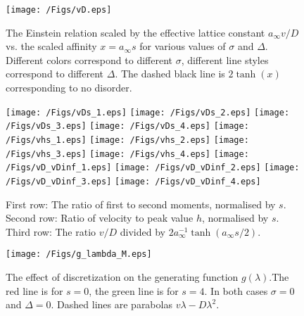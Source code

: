 \documentclass[aps,pre,floats,floatfix,fleqn]{revtex4}
\begin{document}
\begin{figure}[h]
\texttt{[image: /Figs/vD.eps]}

\caption{The Einstein relation scaled by the effective lattice constant $a_{\infty}v/D$
vs. the scaled affinity $x=a_{\infty}s$ for various values of $\sigma$ and $\Delta$.
Different colors correspond to different $\sigma$, different line styles correspond 
to different $\Delta$. 
The dashed black line is $2\tanh(x)$ corresponding to no disorder. 
}
\label{fig2}
\end{figure}



\begin{figure}

%
%
\texttt{[image: /Figs/vDs\_1.eps]}
\texttt{[image: /Figs/vDs\_2.eps]}
\texttt{[image: /Figs/vDs\_3.eps]}
\texttt{[image: /Figs/vDs\_4.eps]}
%
%
\texttt{[image: /Figs/vhs\_1.eps]}
\texttt{[image: /Figs/vhs\_2.eps]}
\texttt{[image: /Figs/vhs\_3.eps]}
\texttt{[image: /Figs/vhs\_4.eps]}
%
\texttt{[image: /Figs/vD\_vDinf\_1.eps]}
\texttt{[image: /Figs/vD\_vDinf\_2.eps]}
\texttt{[image: /Figs/vD\_vDinf\_3.eps]}
\texttt{[image: /Figs/vD\_vDinf\_4.eps]}
%

\caption{
First row: The ratio of first to second moments, normalised by $s$.
Second row: Ratio of velocity to peak value $h$, normalised by $s$.
Third row: The ratio $ v/D $ divided by $2a_{\infty}^{-1}\tanh(a_{\infty}s/2)$.}
\label{fig3}
\end{figure}



\begin{figure}
\texttt{[image: /Figs/g\_lambda\_M.eps]}

\caption{The effect of discretization  on the generating function $g(\lambda)$.The red line is for $s=0$, the green line is for $s=4$. 
In both cases $\sigma=0$ and $\Delta=0$.
Dashed lines are parabolas $v\lambda - D\lambda^2$.
}
\label{fig4}
\end{figure}
\end{document}
